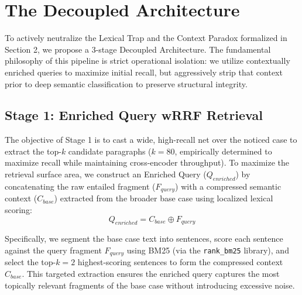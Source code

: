 \documentclass[sigconf]{acmart}
\newcommand{\rev}[1]{{\color{blue}#1}}
\begin{document}

\section{The Decoupled Architecture}

To actively neutralize the Lexical Trap and the Context Paradox formalized in Section 2, we propose a 3-stage Decoupled Architecture. The fundamental philosophy of this pipeline is strict operational isolation: we utilize contextually enriched queries to maximize initial recall, but aggressively strip that context prior to deep semantic classification to preserve structural integrity.

\subsection{Stage 1: Enriched Query wRRF Retrieval}

The objective of Stage 1 is to cast a wide, high-recall net over the noticed case to extract the top-$k$ candidate paragraphs ($k=80$, empirically determined to maximize recall while maintaining cross-encoder throughput). To maximize the retrieval surface area, we construct an Enriched Query ($Q_{enriched}$) by concatenating the raw entailed fragment ($F_{query}$) with a compressed semantic context ($C_{base}$) extracted from the broader base case using localized lexical scoring:
\begin{equation}
    Q_{enriched} = C_{base} \oplus F_{query}
\end{equation}

\rev{Specifically, we segment the base case text into sentences, score each sentence against the query fragment $F_{query}$ using BM25 (via the \texttt{rank\_bm25} library), and select the top-$k=2$ highest-scoring sentences to form the compressed context $C_{base}$. This targeted extraction ensures the enriched query captures the most topically relevant fragments of the base case without introducing excessive noise.}

\end{document}

